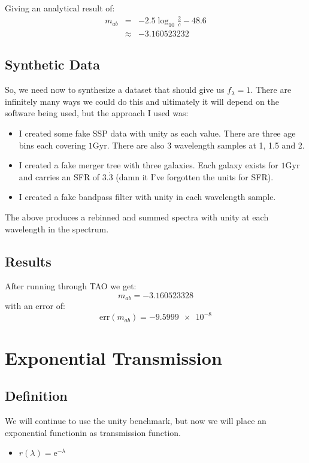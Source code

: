 \documentclass[12pt]{scrartcl}
\begin{document}
Giving an analytical result of:
\begin{eqnarray*}
m_{ab} & = & -2.5\log_{10} \frac{2}{c} - 48.6 \\
& \approx & -3.160523232
\end{eqnarray*}

\subsection{Synthetic Data}

So, we need now to synthesize a dataset that should give us $f_\lambda
= 1$. There are infinitely many ways we could do this and ultimately
it will depend on the software being used, but the approach I used was:
\begin{itemize}
\item I created some fake SSP data with unity as each value. There are
  three age bins each covering $1\mathrm{Gyr}$. There are also 3
  wavelength samples at 1, 1.5 and 2.
\item I created a fake merger tree with three galaxies. Each galaxy
  exists for $1\mathrm{Gyr}$ and carries an SFR of $3.\dot{3}$
  (damn it I've forgotten the units for SFR).
\item I created a fake bandpass filter with unity in each wavelength
  sample.
\end{itemize}
The above produces a rebinned and summed spectra with unity at each
wavelength in the spectrum.

\subsection{Results}

After running through TAO we get:
\[ m_{ab} = -3.160523328 \]
with an error of:
\[ \mathrm{err}(m_{ab}) = \num{-9.5999e-8} \]

\section{Exponential Transmission}

\subsection{Definition}

We will continue to use the unity benchmark, but now we will place an
exponential functionin as transmission function.

\begin{itemize}
  \item $r(\lambda) = \mathrm{e}^{-\lambda}$
\end{itemize}
\end{document}
